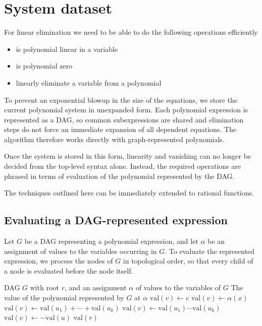 \section*{System dataset}

For linear elimination we need to be able to do the following operations efficiently
\begin{itemize}
  \item is polynomial linear in a variable
  \item is polynomial zero
  \item linearly eliminate a variable from a polynomial
\end{itemize}

To prevent an exponential blowup in the size of the equations, we store the current polynomial system in unexpanded form. Each polynomial expression is represented as a DAG, so common subexpressions are shared and elimination steps do not force an immediate expansion of all dependent equations. The algorithm therefore works directly with graph-represented polynomials.

Once the system is stored in this form, linearity and vanishing can no longer be decided from the top-level syntax alone. Instead, the required operations are phrased in terms of evaluation of the polynomial represented by the DAG.

The techniques outlined here can be immediately extended to rational functions.

\subsection*{Evaluating a DAG-represented expression}

Let $G$ be a DAG representing a polynomial expression, and let $\alpha$ be an assignment of values to the variables occurring in $G$. To evaluate the represented expression, we process the nodes of $G$ in topological order, so that every child of a node is evaluated before the node itself.

\begin{algorithm}[H]
  \caption{Evaluating a polynomial expression represented as a DAG}
  \begin{algorithmic}[1]
    \Require DAG $G$ with root $r$, and an assignment $\alpha$ of values to the variables of $G$
    \Ensure The value of the polynomial represented by $G$ at $\alpha$
    \State $\mathrm{val}(v) \gets c$
    \State $\mathrm{val}(v) \gets \alpha(x)$
    \State $\mathrm{val}(v) \gets \mathrm{val}(u_1) + \cdots + \mathrm{val}(u_k)$
    \State $\mathrm{val}(v) \gets \mathrm{val}(u_1)\cdots \mathrm{val}(u_k)$
    \State $\mathrm{val}(v) \gets -\mathrm{val}(u)$
    \EndIf
    \EndFor
    \State \Return $\mathrm{val}(r)$
  \end{algorithmic}
\end{algorithm}

